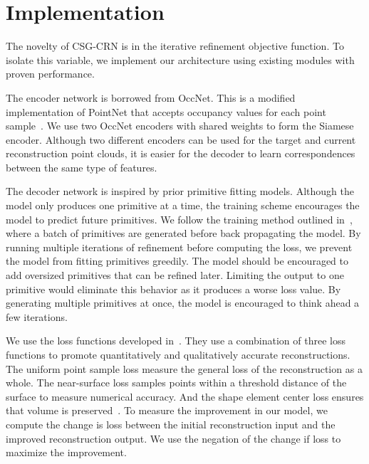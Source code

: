 
\chapter{Implementation}
\label{chap:implementation}

The novelty of CSG-CRN is in the iterative refinement objective function. To isolate this variable, we implement our architecture using existing modules with proven performance.

The encoder network is borrowed from OccNet. This is a modified implementation of PointNet that accepts occupancy values for each point sample~\cite{Mescheder2019}. We use two OccNet encoders with shared weights to form the Siamese encoder. Although two different encoders can be used for the target and current reconstruction point clouds, it is easier for the decoder to learn correspondences between the same type of features.

The decoder network is inspired by prior primitive fitting models. Although the model only produces one primitive at a time, the training scheme encourages the model to predict future primitives. We follow the training method outlined in~\cite{Kleineberg2020}, where a batch of primitives are generated before back propagating the model. By running multiple iterations of refinement before computing the loss, we prevent the model from fitting primitives greedily. The model should be encouraged to add oversized primitives that can be refined later. Limiting the output to one primitive would eliminate this behavior as it produces a worse loss value. By generating multiple primitives at once, the model is encouraged to think ahead a few iterations.

We use the loss functions developed in~\cite{Genova2019, Genova2020}. They use a combination of three loss functions to promote quantitatively and qualitatively accurate reconstructions. The uniform point sample loss measure the general loss of the reconstruction as a whole. The near-surface loss samples points within a threshold distance of the surface to measure numerical accuracy. And the shape element center loss ensures that volume is preserved~\cite{Genova2019}. To measure the improvement in our model, we compute the change is loss between the initial reconstruction input and the improved reconstruction output. We use the negation of the change if loss to maximize the improvement.